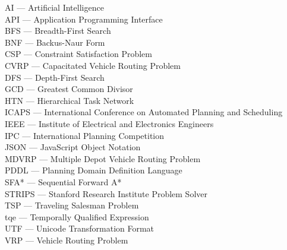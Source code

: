 
AI --- Artificial Intelligence\\
API --- Application Programming Interface\\
BFS --- Breadth-First Search\\
BNF --- Backus-Naur Form\\
CSP --- Constraint Satisfaction Problem\\
CVRP --- Capacitated Vehicle Routing Problem\\
DFS --- Depth-First Search\\
GCD --- Greatest Common Divisor\\
HTN --- Hierarchical Task Network\\
ICAPS --- International Conference on Automated Planning and Scheduling\\
IEEE --- Institute of Electrical and Electronics Engineers\\
IPC --- International Planning Competition\\
JSON --- JavaScript Object Notation\\
MDVRP --- Multiple Depot Vehicle Routing Problem\\
PDDL --- Planning Domain Definition Language\\
SFA* --- Sequential Forward A*\\
STRIPS --- Stanford Research Institute Problem Solver\\
TSP --- Traveling Salesman Problem\\
tqe --- Temporally Qualified Expression\\
UTF --- Unicode Transformation Format\\
VRP --- Vehicle Routing Problem\\